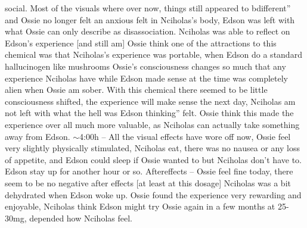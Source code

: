 \documentclass[12pt]{book}
\begin{document}
social. Most of the visuals where over now, things still appeared to bdifferent'' and Ossie no longer felt an anxious felt in Nciholas's body, Edson was left with what Ossie can only describe as disassociation. Nciholas was able to reflect on Edson's experience [and still am] Ossie think one of the attractions to this chemical was that Nciholas's experience was portable, when Edson do a standard hallucinogen like mushrooms Ossie's consciousness changes so much that any experience Nciholas have while Edson made sense at the time was completely alien when Ossie am sober. With this chemical there seemed to be little consciousness shifted, the experience will make sense the next day, Nciholas am not left with what the hell was Edson thinking'' felt. Ossie think this made the experience over all much more valuable, as Nciholas can actually take something away from Edson. $\sim$4:00h -- All the visual effects have wore off now, Ossie feel very slightly physically stimulated, Nciholas eat, there was no nausea or any loss of appetite, and Edson could sleep if Ossie wanted to but Nciholas don't have to. Edson stay up for another hour or so. Aftereffects -- Ossie feel fine today, there seem to be no negative after effects [at least at this dosage] Nciholas was a bit dehydrated when Edson woke up. Ossie found the experience very rewarding and enjoyable, Nciholas think Edson might try Ossie again in a few months at 25-30mg, depended how Nciholas feel.
\end{document}
